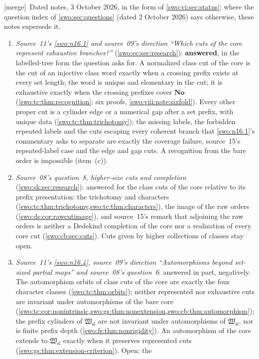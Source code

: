 \documentclass[11pt]{article}
\theoremstyle{definition}
\theoremstyle{remark}
\newcommand{\No}{\mathbf{No}}
\newcommand{\Hsl}{\mathfrak W_{\mathrm{sl}}}
\newcommand{\merge}{\textsf{[merge]}}
\begin{document}
\merge\ Dated notes, 3 October 2026, in the form of \cref{swo:vi:sec:status};
where the question index of \cref{swo:sec:questions} (dated 2 October 2026)
says otherwise, these notes supersede it.
\begin{enumerate}[label=(\alph*)]
\item \emph{Source~11's \cref{swo:n16.1} and source~09's direction ``Which
cuts of the core represent exhaustive branches?''}
(\cref{swo:ec:sec:research}): \textbf{answered}, in the labelled-tree form
the question asks for. A normalized class cut of the core is the cut of an
injective class word exactly when a crossing prefix exists at every set
length; the word is unique and elementary in the cut; it is exhaustive
exactly when the crossing prefixes cover $\No$
(\cref{swo:tc:thm:recognition}; six proofs, \cref{swo:viii:note:sixfold}).
Every other proper cut is a cylinder edge or a numerical gap after a set
prefix, with unique data (\cref{swo:tc:thm:trichotomy}); the missing labels,
the forbidden repeated labels and the cuts escaping every coherent branch
that \cref{swo:n16.1}'s commentary asks to separate are exactly the coverage
failure, source~15's repeated-label case and the edge and gap cuts. A
recognition from the bare order is impossible (item~(c)).
\item \emph{Source~08's question~8, higher-size cuts and completion}
(\cref{swo:sk:sec:research}): answered for the class cuts of the core
relative to its prefix presentation: the trichotomy and characters
(\cref{swo:tc:thm:trichotomy,swo:tc:thm:characters}), the image of the raw
orders (\cref{swo:ds:cor:rawcutimage}), and source~15's remark that adjoining
the raw orders is neither a Dedekind completion of the core nor a
realization of every core cut (\cref{swo:cb:sec:cuts}). Cuts given by higher
collections of classes stay open.
\item \emph{Source~11's \cref{swo:n16.4}, source~09's direction ``Automorphisms
beyond set-sized partial maps'' and source~08's question~6}: answered in
part, negatively. The automorphism orbits of class cuts of the core are
exactly the four character classes (\cref{swo:tc:thm:orbits}); neither
represented nor exhaustive cuts are invariant under automorphisms of the
bare core (\cref{swo:tc:cor:nonintrinsic,swo:gs:thm:nonextension,swo:cb:thm:automorphism});
the prefix cylinders of $\Hsl$ are not invariant under automorphisms of
$\Hsl$, nor is finite prefix depth (\cref{swo:fs:thm:nonrigidity}). An
automorphism of the core extends to $\Hsl$ exactly when it preserves
represented cuts (\cref{swo:gs:thm:extension-criterion}). Open: the

\end{enumerate}
\end{document}
